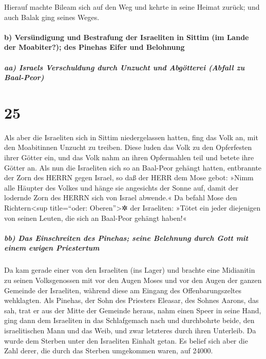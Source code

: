 Hierauf machte Bileam sich auf den Weg und kehrte in
seine Heimat zurück; und auch Balak ging seines Weges.

\hypertarget{b-versuxfcndigung-und-bestrafung-der-israeliten-in-sittim-im-lande-der-moabiter-des-pinehas-eifer-und-belohnung}{%
\paragraph{b) Versündigung und Bestrafung der Israeliten in Sittim (im
Lande der Moabiter?); des Pinehas Eifer und
Belohnung}\label{b-versuxfcndigung-und-bestrafung-der-israeliten-in-sittim-im-lande-der-moabiter-des-pinehas-eifer-und-belohnung}}

\hypertarget{aa-israels-verschuldung-durch-unzucht-und-abguxf6tterei-abfall-zu-baal-peor}{%
\subparagraph{aa) Israels Verschuldung durch Unzucht und Abgötterei
(Abfall zu
Baal-Peor)}\label{aa-israels-verschuldung-durch-unzucht-und-abguxf6tterei-abfall-zu-baal-peor}}

\hypertarget{section-24}{%
\section{25}\label{section-24}}

Als aber die Israeliten sich in Sittim niedergelassen
hatten, fing das Volk an, mit den Moabitinnen Unzucht zu treiben.
Diese luden das Volk zu den Opferfesten ihrer Götter ein,
und das Volk nahm an ihren Opfermahlen teil und betete ihre Götter an.
Als nun die Israeliten sich so an Baal-Peor gehängt
hatten, entbrannte der Zorn des HERRN gegen Israel, so daß
der HERR dem Mose gebot: »Nimm alle Häupter des Volkes und hänge sie
angesichts der Sonne auf, damit der lodernde Zorn des HERRN sich von
Israel abwende.« Da befahl Mose den Richtern\textless sup
title=``oder: Oberen''\textgreater✲ der Israeliten: »Tötet ein jeder
diejenigen von seinen Leuten, die sich an Baal-Peor gehängt haben!«

\hypertarget{bb-das-einschreiten-des-pinehas-seine-belehnung-durch-gott-mit-einem-ewigen-priestertum}{%
\subparagraph{bb) Das Einschreiten des Pinehas; seine Belehnung durch
Gott mit einem ewigen
Priestertum}\label{bb-das-einschreiten-des-pinehas-seine-belehnung-durch-gott-mit-einem-ewigen-priestertum}}

Da kam gerade einer von den Israeliten (ins Lager) und
brachte eine Midianitin zu seinen Volksgenossen mit vor den Augen Moses
und vor den Augen der ganzen Gemeinde der Israeliten, während diese am
Eingang des Offenbarungszeltes wehklagten. Als Pinehas,
der Sohn des Priesters Eleasar, des Sohnes Aarons, das sah, trat er aus
der Mitte der Gemeinde heraus, nahm einen Speer in seine Hand,
ging dann dem Israeliten in das Schlafgemach nach und
durchbohrte beide, den israelitischen Mann und das Weib, und zwar
letzteres durch ihren Unterleib. Da wurde dem Sterben unter den
Israeliten Einhalt getan. Es belief sich aber die Zahl
derer, die durch das Sterben umgekommen waren, auf 24000.

